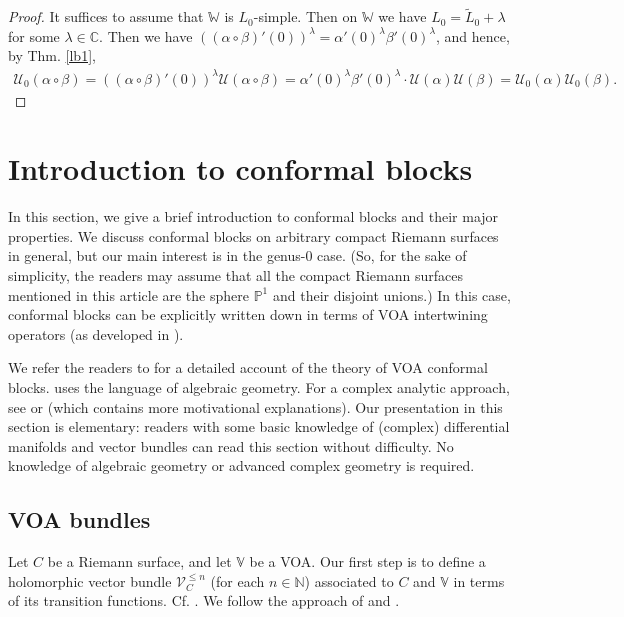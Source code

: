 \documentclass[11pt,b5paper,notitlepage]{article}
\theoremstyle{definition}
\theoremstyle{plain}
\newcommand{\mc}{\mathcal}
\newcommand{\wtd}{\widetilde}
\newcommand{\scr}{\mathscr}
\newcommand{\Vbb}{\mathbb V}
\newcommand{\Wbb}{\mathbb W}
\newcommand{\Cbb}{\mathbb C}
\newcommand{\Nbb}{\mathbb N}
\newcommand{\Pbb}{\mathbb P}
\numberwithin{equation}{section}
\begin{document}
\begin{proof}
It suffices to assume that $\Wbb$ is $L_0$-simple. Then on $\Wbb$ we have $L_0=\wtd L_0+\lambda$ for some $\lambda\in\Cbb$. Then we have $((\alpha\circ\beta)'(0))^\lambda=\alpha'(0)^\lambda\beta'(0)^\lambda$, and hence, by Thm. \ref{lb1},
\begin{align*}
\mc U_0(\alpha\circ\beta)=((\alpha\circ\beta)'(0))^\lambda\mc U(\alpha\circ\beta)=\alpha'(0)^\lambda\beta'(0)^\lambda\cdot\mc U(\alpha)\mc U(\beta)=\mc U_0(\alpha)\mc U_0(\beta).
\end{align*} 
\end{proof}




\section{Introduction to conformal blocks}



In this section, we give a brief introduction to conformal blocks and their major properties. We discuss conformal blocks on arbitrary compact Riemann surfaces in general, but our main interest is in the genus-0 case. (So, for the sake of simplicity, the readers may assume that all the compact Riemann surfaces mentioned in this article are the sphere $\Pbb^1$ and their disjoint unions.)  In this case, conformal blocks can be explicitly written down in terms of VOA intertwining operators (as developed in \cite{FHL93}). 


We refer the readers to \cite{FB04} for a detailed account of the theory of VOA conformal blocks. \cite{FB04} uses the language of algebraic geometry. For a complex analytic approach, see \cite{Gui23a} or \cite{Gui23b} (which contains more motivational explanations). Our presentation in this section is elementary:  readers with some basic knowledge of (complex) differential manifolds and vector bundles can read this section without difficulty. No knowledge of algebraic geometry or advanced complex geometry is required.



\subsection{VOA bundles}


Let $C$ be a Riemann surface, and let $\Vbb$ be a VOA. Our first step is to define a holomorphic vector bundle $\scr V_C^{\leq n}$ (for each $n\in\Nbb$) associated to $C$ and $\Vbb$ in terms of its transition functions. Cf. \cite{FB04}. We follow the approach of \cite[Sec. 2]{Gui23a} and \cite[Sec. 11]{Gui23b}.
\end{document}
